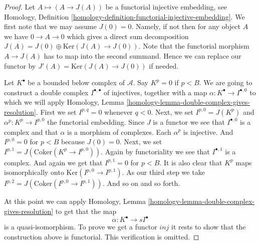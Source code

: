 \begin{proof}
Let $A \mapsto (A \to J(A))$ be a functorial injective embedding, see
Homology, Definition \ref{homology-definition-functorial-injective-embedding}.
We first note that we may assume $J(0) = 0$. Namely, if not then
for any object $A$ we have $0 \to A \to 0$ which gives
a direct sum decomposition $J(A) = J(0) \oplus \text{Ker}(J(A) \to J(0))$.
Note that the functorial morphism $A \to J(A)$ has to map
into the second summand. Hence we can replace our functor
by $J'(A) = \text{Ker}(J(A) \to J(0))$ if needed.

\medskip\noindent
Let $K^\bullet$ be a bounded below complex of $\mathcal{A}$.
Say $K^p = 0$ if $p < B$.
We are going to construct a double complex $I^{\bullet, \bullet}$
of injectives, together with a map $\alpha : K^\bullet \to I^{\bullet, 0}$
to which we will apply
Homology, Lemma \ref{homology-lemma-double-complex-gives-resolution}.
First we set $I^{p, q} = 0$ whenever $q < 0$.
Next, we set $I^{p, 0} = J(K^p)$ and $\alpha^p : K^p \to I^{p, 0}$
the functorial embedding. Since $J$ is a functor we see that
$I^{\bullet, 0}$ is a complex and that $\alpha$ is a
morphism of complexes. Each $\alpha^p$ is injective. And
$I^{p, 0} = 0$ for $p < B$ because $J(0) = 0$. Next, we set
$I^{p, 1} = J(\text{Coker}(K^p \to I^{p, 0}))$. Again by functoriality
we see that $I^{\bullet, 1}$ is a complex. And again we get
that $I^{p, 1} = 0$ for $p < B$. It is also clear that
$K^p$ maps isomorphically onto $\text{Ker}(I^{p, 0} \to I^{p, 1})$.
As our third step we take $I^{p, 2} = J(\text{Coker}(I^{p, 0} \to I^{p, 1}))$.
And so on and so forth.

\medskip\noindent
At this point we can apply
Homology, Lemma \ref{homology-lemma-double-complex-gives-resolution}
to get that the map
$$
\alpha : K^\bullet \to sI^\bullet
$$
is a quasi-isomorphism. To prove we get a functor $inj$ it
rests to show that the construction above
is functorial. This verification is omitted.


\end{proof}
